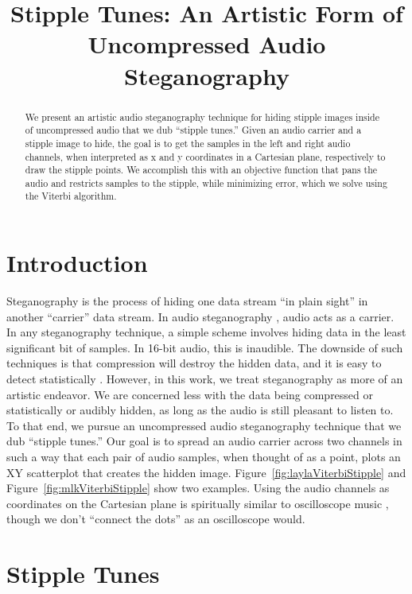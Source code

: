 \documentclass{article}
\title{Stipple Tunes: An Artistic Form of Uncompressed Audio Steganography}
\begin{document}
%
\maketitle
%
\begin{abstract}
  We present an artistic audio steganography technique for hiding stipple images inside of uncompressed audio that we dub ``stipple tunes.''  Given an audio carrier and a stipple image to hide, the goal is to get the samples in the left and right audio channels, when interpreted as x and y coordinates in a Cartesian plane, respectively to draw the stipple points.  We accomplish this with an objective function that pans the audio and restricts samples to the stipple, while minimizing error, which we solve using the Viterbi algorithm.

\end{abstract}
%
\section{Introduction}\label{sec:introduction}

Steganography is the process of hiding one data stream ``in plain sight'' in another ``carrier'' data stream.  In audio steganography \cite{djebbar_comparative_2012, dutta_overview_2020}, audio acts as a carrier.  In any steganography technique, a simple scheme involves hiding data in the least significant bit of samples.  In 16-bit audio, this is inaudible.  The downside of such techniques is that compression will destroy the hidden data, and it is easy to detect statistically \cite{fridrich2001reliable}.  However, in this work, we treat steganography as more of an artistic endeavor.  We are concerned less with the data being compressed or statistically or audibly hidden, as long as the audio is still pleasant to listen to.  To that end, we pursue an uncompressed audio steganography technique that we dub ``stipple tunes.''  Our goal is to spread an audio carrier across two channels in such a way that each pair of audio samples, when thought of as a point, plots an XY scatterplot that creates the hidden image.  Figure~\ref{fig:laylaViterbiStipple} and Figure~\ref{fig:mlkViterbiStipple} show two examples.  Using the audio channels as coordinates on the Cartesian plane is spiritually similar to oscilloscope music \cite{felix2021_RenderingShapes, Charles2013, teschler2021}, though we don't ``connect the dots'' as an oscilloscope would.  

\section{Stipple Tunes}
\end{document}
